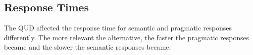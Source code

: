 \documentclass[12pt]{article}
\begin{document}



\pagebreak
\subsection*{Response Times}

The QUD affected the response time for semantic and pragmatic responses differently. The more relevant the alternative, the faster the pragmatic responses became and the slower the semantic responses became. 
\end{document}
